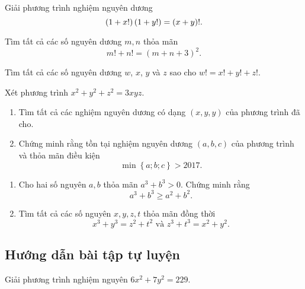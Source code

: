 \begin{btt}
Giải phương trình nghiệm nguyên dương
\[\left(\displaystyle 1+x! \right)\left(\displaystyle 1+y! \right)=(x+y)!.\]
\end{btt}

\begin{btt}
Tìm tất cả các số nguyên dương $m,n$ thỏa mãn 
\[m !+n !=(m+n+3)^{2}.\]
\end{btt}

\begin{btt}
Tìm tất cả các số nguyên dương $w$, $x$, $y$ và $z$ sao cho $w!=x!+y!+z!$.
\end{btt}

\begin{btt}
Xét phương trình $x^2+y^2+z^2=3xyz.$
\begin{enumerate}[a,]
    \item Tìm tất cả các nghiệm nguyên dương có dạng $\left( x,y,y \right)$ của phương trình đã cho.
    \item Chứng minh rằng tồn tại nghiệm nguyên dương $\left( a,b,c \right)$ của phương trình và thỏa mãn điều kiện 
    $$\min \left\{ a;b;c \right\}>2017.$$
\end{enumerate}
\end{btt}

\begin{btt}
\hfill
\begin{enumerate}[a,]
    \item Cho hai số nguyên $a,b$ thỏa mãn $a^3+b^3>0.$ Chứng minh rằng
    \[a^3+b^3\ge a^2+b^2.\]
    \item Tìm tất cả các số nguyên $x,y,z,t$ thỏa mãn đồng thời
\[x^3+y^3=z^2+t^2\text{ và }z^3+t^3=x^2+y^2.\]
\end{enumerate}
\end{btt}

\subsection*{Hướng dẫn bài tập tự luyện}

\begin{gbtt}
Giải phương trình nghiệm nguyên $6x^2+7y^2=229.$
\end{gbtt}



